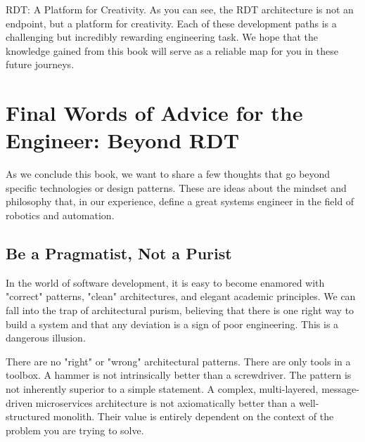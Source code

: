 \begin{navigationbox}{RDT: A Platform for Creativity.}
    As you can see, the RDT architecture is not an endpoint, but a platform for creativity. Each of these development paths is a challenging but incredibly rewarding engineering task. We hope that the knowledge gained from this book will serve as a reliable map for you in these future journeys.
\end{navigationbox}





\section{Final Words of Advice for the Engineer: Beyond RDT}
\label{sec:final_advice}

As we conclude this book, we want to share a few thoughts that go beyond specific technologies or design patterns. These are ideas about the mindset and philosophy that, in our experience, define a great systems engineer in the field of robotics and automation.

\subsection{Be a Pragmatist, Not a Purist}
\label{subsec:pragmatist_not_purist}

In the world of software development, it is easy to become enamored with "correct" patterns, "clean" architectures, and elegant academic principles. We can fall into the trap of architectural purism, believing that there is one right way to build a system and that any deviation is a sign of poor engineering. This is a dangerous illusion.

There are no "right" or "wrong" architectural patterns. There are only tools in a toolbox. A hammer is not intrinsically better than a screwdriver. The  pattern is not inherently superior to a simple  statement. A complex, multi-layered, message-driven microservices architecture is not axiomatically better than a well-structured monolith. Their value is entirely dependent on the context of the problem you are trying to solve.

